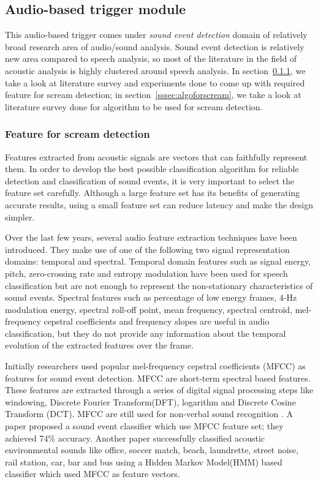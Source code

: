 \subsection{Audio-based trigger module}
This audio-based trigger comes under \emph{sound event detection} domain of relatively broad research area of audio/sound analysis. Sound event detection is relatively new area compared to speech analysis, so most of the literature in the field of acoustic analysis is highly clustered around speech analysis. In section~\ref{sssec:featforscream}, we take a look at literature survey and experiments done to come up with required feature for scream detection; in section~\ref{sssec:algoforscream}, we take a look at literature survey done for algorithm to be used for scream detection.

\subsubsection{Feature for scream detection}
\label{sssec:featforscream}
Features extracted from acoustic signals are vectors that can faithfully represent them. In order to develop the best possible classification algorithm for reliable detection and classification of sound events, it is very important to select the feature set carefully. Although a large feature set has its benefits of generating accurate results, using a small feature set can reduce latency and make the design simpler.

Over the last few years, several audio feature extraction techniques have been introduced. They make use of one of the following two signal representation domains: temporal
and spectral. Temporal domain features such as signal energy, pitch, zero-crossing \cite{paper4} rate and entropy modulation \cite{paper5} have been used for speech classification but are not enough to represent the non-stationary characteristics of sound events. Spectral features such as percentage of low energy frames, 4-Hz modulation energy, spectral roll-off point, mean frequency, spectral centroid, mel-frequency cepstral coefficients and frequency slopes are useful in audio classification, but they do not provide any information about the temporal evolution of the extracted features over the frame.

Initially researchers used popular mel-frequency cepstral coefficients (MFCC) as features for sound event detection. MFCC are short-term spectral based features. These features are extracted through a series of digital signal processing steps like windowing, Discrete Fourier Transform(DFT), logarithm and Discrete Cosine Transform (DCT). MFCC are still used for non-verbal sound recognition \cite{paper6}. A paper\cite{paper7} proposed a sound event classifier which use MFCC feature set; they achieved 74\% accuracy. Another paper \cite{paper8} successfully classified acoustic environmental sounds like office, soccer match, beach, laundrette, street noise, rail station, car, bar and bus using a Hidden Markov Model(HMM) based classifier which used MFCC as feature vectors.

